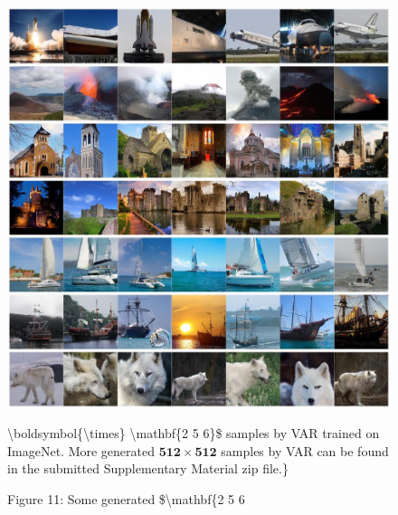 \documentclass{article}
\begin{document}
\begin{figure}[h]
\begin{center}
  \includegraphics[width=\textwidth]{2025_10_26_62f95e615e8879e267a8g-15}
\captionsetup{labelformat=empty}
\caption{Figure 11: Some generated \$\textbackslash mathbf\{2 5 6} \textbackslash boldsymbol\{\textbackslash times\} \textbackslash mathbf\{2 5 6\}\$ samples by VAR trained on ImageNet. More generated $\mathbf{5 1 2 \times 5 1 2}$ samples by VAR can be found in the submitted Supplementary Material zip file.\}\end{center}
\end{figure}
\end{document}
